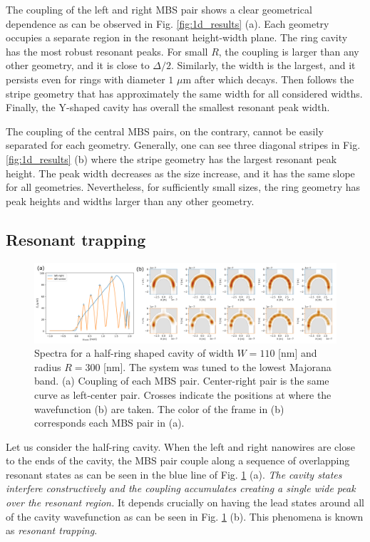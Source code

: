 The coupling of the left and right MBS pair shows a clear geometrical dependence as can be observed in Fig. \ref{fig:1d_results} (a).
Each geometry occupies a separate region in the resonant height-width plane.
The ring cavity has the most robust resonant peaks.
For small $R$, the coupling is larger than any other geometry, and it is close to $\Delta/2$.
Similarly, the width is the largest, and it persists even for rings with diameter $1$ $\mu$m after which decays.
Then follows the stripe geometry that has approximately the same width for all considered widths.
Finally, the Y-shaped cavity has overall the smallest resonant peak width. 

The coupling of the central MBS pairs, on the contrary, cannot be easily separated for each geometry.
Generally, one can see three diagonal stripes in Fig. \ref{fig:1d_results} (b) where the stripe geometry has the largest resonant peak height.
The peak width decreases as the size increase, and it has the same slope for all geometries.
Nevertheless, for sufficiently small sizes, the ring geometry has peak heights and widths larger than any other geometry.

\subsection{Resonant trapping}

\begin{figure}[h!]
\centering
  \includegraphics[width=\linewidth]{figures/resonant_trapping_ring.pdf}
  \caption{Spectra for a half-ring shaped cavity of width $W=110$ [nm] and radius $R=300$ [nm]. The system was tuned to the lowest Majorana band. (a) Coupling of each MBS pair. Center-right pair is the same curve as left-center pair. Crosses indicate the positions at where the wavefunction (b) are taken. The color of the frame in (b) corresponds each MBS pair in (a).}
  \label{fig:resonant_trapping}
\end{figure}

Let us consider the half-ring cavity.
When the left and right nanowires are close to the ends of the cavity, the MBS pair couple along a sequence of overlapping resonant states as can be seen in the blue line of Fig. \ref{fig:resonant_trapping} (a).
\textit{The cavity states interfere constructively and the coupling accumulates creating a single wide peak over the resonant region.}
It depends crucially on having the lead states around all of the cavity wavefunction as can be seen in Fig. \ref{fig:resonant_trapping} (b).
This phenomena is known as \textit{resonant trapping}.


